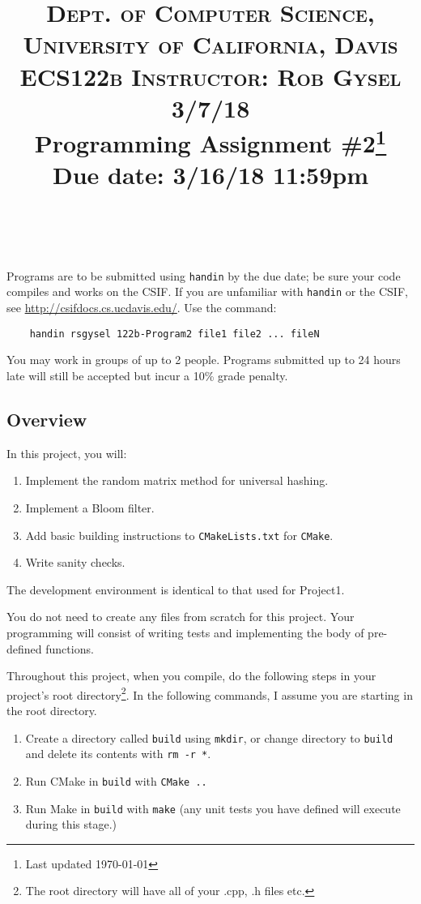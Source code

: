 \documentclass[paper=a4, fontsize=11pt]{scrartcl} %
\title{	
\normalfont \normalsize 
\textsc{Dept. of Computer Science, University of California, Davis\\ECS122b \hspace{.5in} Instructor: Rob Gysel \hspace{.5in} 3/7/18} %
\horrule{0.5pt} \\[0.4cm] %
\huge Programming Assignment \#2\footnote{Last updated \today}\\Due date: 3/16/18 11:59pm \\ %
\horrule{2pt} \\[0.5cm] %
}
\author{} %
\date{}
\numberwithin{equation}{section} %
\numberwithin{figure}{section} %
\numberwithin{table}{section} %
\begin{document}
\maketitle %
\vspace{-3cm}

Programs are to be submitted using \texttt{handin} by the due date; be sure your code compiles and works on the CSIF. If you are unfamiliar with \texttt{handin} or the CSIF, see \url{http://csifdocs.cs.ucdavis.edu/}. Use the command:

\begin{verbatim}
	handin rsgysel 122b-Program2 file1 file2 ... fileN
\end{verbatim}

You may work in groups of up to 2 people.
Programs submitted up to 24 hours late will still be accepted but incur a 10\% grade penalty.

\subsection*{Overview}
In this project, you will:
\begin{enumerate}
	\item Implement the random matrix method for universal hashing.
	\item Implement a Bloom filter.
	\item Add basic building instructions to \texttt{CMakeLists.txt} for \texttt{CMake}.
	\item Write sanity checks.
\end{enumerate}

The development environment is identical to that used for Project1.

You do not need to create any files from scratch for this project.
Your programming will consist of writing tests and implementing the body of pre-defined functions.

Throughout this project, when you compile, do the following steps in your project's root directory\footnote{The root directory will have all of your .cpp, .h files etc.}.
In the following commands, I assume you are starting in the root directory.
\begin{enumerate}
	\item Create a directory called \texttt{build} using \texttt{mkdir}, or change directory to \texttt{build} and delete its contents with \texttt{rm -r *}.
	\item Run CMake in \texttt{build} with \texttt{CMake ..}
	\item Run Make in \texttt{build} with \texttt{make} (any unit tests you have defined will execute during this stage.)
\end{enumerate}
\end{document}
